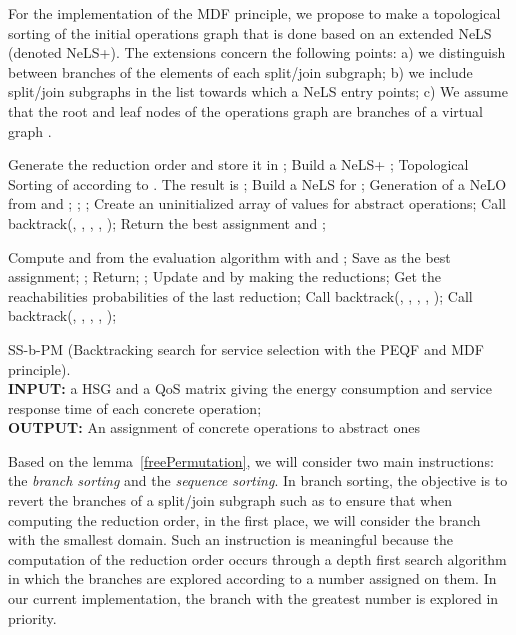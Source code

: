 \documentclass[a4paper]{article}
\begin{document}
For the implementation of the MDF principle, we propose to make a topological sorting of the initial operations 
graph that is done based on an extended NeLS (denoted NeLS+). The extensions concern the following points: a) we distinguish between 
branches of the elements of each split/join subgraph; b) we include split/join subgraphs in the list towards which 
a NeLS entry points; c) We assume that the root and leaf nodes of the operations graph are branches of a 
virtual graph .

\begin{algorithm}[H]                    
\begin{algorithmic}[1]
\scriptsize
{}
	\State Generate the reduction order and store it in ;
	\State Build a NeLS+ ;
	\State Topological Sorting of  according to . The result is ;
	\State Build a NeLS  for ;
	\State Generation of a NeLO  from  and ;
        \State ;  ;
	\State Create an uninitialized array  of values for abstract operations;
	\State Call backtrack(, , , , );
	\State Return the best assignment and ;
\EndFunction

\If{}
	\State Compute  and  from the evaluation algorithm with  and ;
		\If{}
			\State Save  as the best assignment;
			\State ;
		\EndIf
	\EndIf
	\State Return;
\EndIf
{}
\State  ;
\State  Update  and  by making the reductions;
\State Get the reachabilities probabilities  of the last reduction;
\If{  }
\State Call backtrack(, , , ,  );
\EndIf
\EndIf
\Else
\State Call backtrack(, , , ,  );
\EndIf
\EndFor
\EndFunction

\normalsize
\end{algorithmic}
\caption{\scriptsize SS-b-PM (Backtracking search for service selection with the PEQF and MDF principle). \\ {\bf INPUT:} a HSG  and a QoS matrix  giving the energy consumption and service response time of each concrete operation;  \\ {\bf OUTPUT:} An assignment of concrete operations to abstract ones }
\label{alg:Backtracking}  
\end{algorithm}

Based on the lemma~\ref{freePermutation}, we will consider two main instructions: the {\it branch sorting} and the 
{\it sequence sorting}. In branch sorting, the objective is to revert the branches of a split/join subgraph such as to 
ensure that when computing the reduction order, in  the first place, we will consider the branch with the smallest domain. 
Such an instruction is meaningful because the computation of the reduction order occurs through a 
depth first search algorithm in which the branches are explored according to a number assigned on them. 
In our current implementation, the branch with the greatest number is explored in priority.
\end{document}
